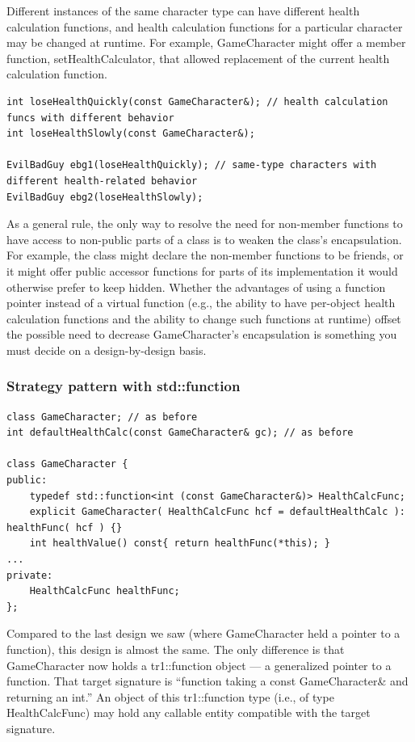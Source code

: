 \documentclass[a4paper,12pt,notitlepage]{article}
\begin{document}
Different instances of the same character type can have different health calculation functions, and health calculation functions for a particular character may be changed at runtime. For example, GameCharacter might offer a member function, setHealthCalculator, that allowed replacement of the current health calculation function.

\begin{verbatim}
int loseHealthQuickly(const GameCharacter&); // health calculation funcs with different behavior
int loseHealthSlowly(const GameCharacter&);

EvilBadGuy ebg1(loseHealthQuickly); // same-type characters with different health-related behavior
EvilBadGuy ebg2(loseHealthSlowly);
\end{verbatim}

As a general rule, the only way to resolve the need for non-member functions to have access to non-public parts of a class is to weaken the class's encapsulation. For example, the class might declare the
non-member functions to be friends, or it might offer public accessor functions for parts of its implementation it would otherwise prefer to keep hidden. Whether the advantages of using a function pointer
instead of a virtual function (e.g., the ability to have per-object health calculation functions and the ability to change such functions at runtime) offset the possible need to decrease GameCharacter's encapsulation is something you must decide on a design-by-design basis.


\subsubsection{Strategy pattern with std::function}

\begin{verbatim}
class GameCharacter; // as before
int defaultHealthCalc(const GameCharacter& gc); // as before

class GameCharacter {
public:
    typedef std::function<int (const GameCharacter&)> HealthCalcFunc;
    explicit GameCharacter( HealthCalcFunc hcf = defaultHealthCalc ): healthFunc( hcf ) {}
    int healthValue() const{ return healthFunc(*this); }
...
private:
    HealthCalcFunc healthFunc;
};
\end{verbatim}

Compared to the last design we saw (where GameCharacter held a pointer to a function), this design is almost the same. The only difference is that GameCharacter now holds a tr1::function object — a generalized pointer to a function. That target signature is “function taking a const GameCharacter\& and returning an int.” An object of this tr1::function type (i.e., of type HealthCalcFunc) may hold any callable entity compatible with the target signature.
\end{document}
